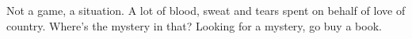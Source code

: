 

Not a game, a situation.  A lot of blood, sweat and tears spent on
behalf of love of country.  Where's the mystery in that?  Looking for
a mystery, go buy a book.

\bye
